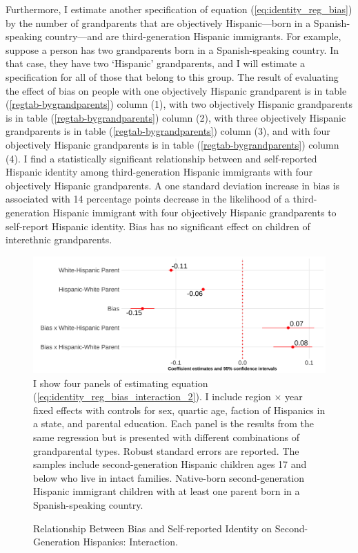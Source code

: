 \documentclass[12pt, fullpage]{article}
\newcommand{\note}[1]{\flushleft\footnotesize{#1}}
\begin{document}
Furthermore, I estimate another specification of equation (\ref{eq:identity_reg_bias}) by the number of grandparents that are objectively Hispanic---born in a Spanish-speaking country---and are third-generation Hispanic immigrants. For example, suppose a person has two grandparents born in a Spanish-speaking country. In that case, they have two `Hispanic' grandparents, and I will estimate a specification for all of those that belong to this group. The result of evaluating the effect of bias on people with one objectively Hispanic grandparent is in table (\ref{regtab-bygrandparents}) column (1), with two objectively Hispanic grandparents is in table (\ref{regtab-bygrandparents}) column (2), with three objectively Hispanic grandparents is in table (\ref{regtab-bygrandparents}) column (3), and with four objectively Hispanic grandparents is in table (\ref{regtab-bygrandparents}) column (4). I find a statistically significant relationship between and self-reported Hispanic identity among third-generation Hispanic immigrants with four objectively Hispanic grandparents. A one standard deviation increase in bias is associated with 14 percentage points decrease in the likelihood of a third-generation Hispanic immigrant with four objectively Hispanic grandparents to self-report Hispanic identity. Bias has no significant effect on children of interethnic grandparents.  



\begin{center}
\begin{figure}[H]
\caption{Relationship Between Bias and Self-reported Identity on Second-Generation Hispanics: Interaction.}
\includegraphics[width=\textwidth]{figure/skin-iat-regression-interaction-bygen-plot-second.png} 
\label{fig:reg-interaction-second}
\flushleft\footnotesize{\note{I show four panels of estimating equation (\ref{eq:identity_reg_bias_interaction_2}). I include region $\times$ year fixed effects with controls for sex, quartic age, faction of Hispanics in a state, and parental education. Each panel is the results from the same regression but is presented with different combinations of grandparental types. Robust standard errors are reported. The samples include second-generation Hispanic children ages 17 and below who live in intact families. Native-born second-generation Hispanic immigrant children with at least one parent born in a Spanish-speaking country.}}
\end{figure}
\end{center}
\end{document}
